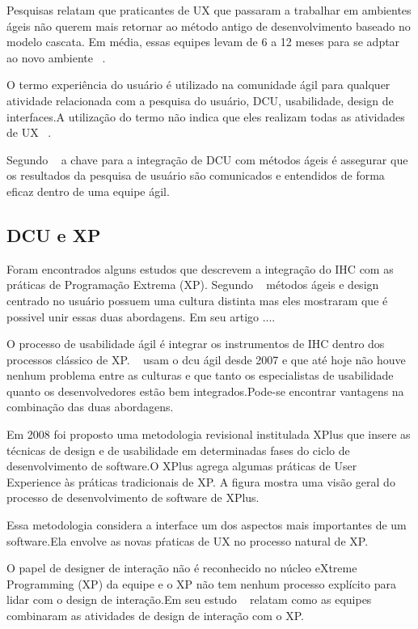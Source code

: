 	Pesquisas relatam que praticantes de UX que passaram a trabalhar em ambientes ágeis não querem mais retornar ao método antigo de desenvolvimento baseado no modelo cascata. Em média, essas equipes levam de 6 a 12 meses para se adptar ao novo ambiente ~\cite{santos2012}.

	O termo experiência do usuário é utilizado na comunidade ágil para qualquer atividade relacionada com a pesquisa do usuário, DCU, usabilidade, design de interfaces.A utilização do termo não indica que eles realizam todas as atividades de UX ~\cite{santos2012}.

	Segundo ~ a chave para a integração de DCU com métodos ágeis é assegurar que os resultados da pesquisa de usuário são comunicados e entendidos de forma eficaz dentro de uma equipe ágil.


\subsection {DCU e XP}

	Foram encontrados alguns estudos que descrevem a integração do IHC com as práticas de Programação Extrema (XP). Segundo ~ métodos ágeis e design centrado no usuário possuem uma cultura distinta mas eles mostraram que é possivel unir essas duas abordagens. Em seu artigo ....

	O processo de usabilidade ágil é integrar os instrumentos de IHC dentro dos processos clássico de XP. ~ usam o dcu ágil desde 2007 e que até hoje não houve nenhum problema entre as culturas e que tanto os especialistas de usabilidade quanto os desenvolvedores estão bem integrados.Pode-se encontrar vantagens na combinação das duas abordagens. 

	Em 2008 foi proposto uma metodologia revisional institulada XPlus que insere as técnicas de design e de usabilidade em determinadas fases do ciclo de desenvolvimento de software.O XPlus agrega algumas práticas de User Experience às práticas tradicionais de XP. A figura mostra uma visão geral do processo de desenvolvimento de software de XPlus.

	Essa metodologia considera a interface um dos aspectos mais importantes de um software.Ela envolve as novas pŕaticas de UX no processo natural de XP.

	O papel de designer de interação não é reconhecido no núcleo eXtreme Programming (XP) da equipe e o XP não tem nenhum processo explícito para lidar com o design de interação.Em seu estudo ~ relatam como as equipes combinaram as atividades de design de interação com o XP. 

